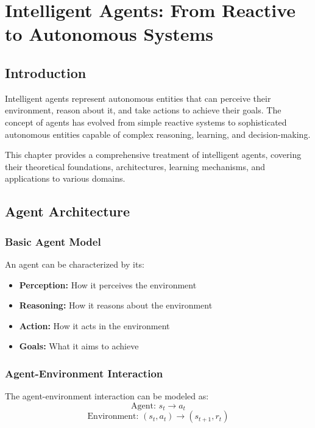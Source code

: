\chapter{Intelligent Agents: From Reactive to Autonomous Systems}

\section{Introduction}

Intelligent agents represent autonomous entities that can perceive their environment, reason about it, and take actions to achieve their goals. The concept of agents has evolved from simple reactive systems to sophisticated autonomous entities capable of complex reasoning, learning, and decision-making.

This chapter provides a comprehensive treatment of intelligent agents, covering their theoretical foundations, architectures, learning mechanisms, and applications to various domains.

\section{Agent Architecture}

\subsection{Basic Agent Model}

An agent can be characterized by its:
\begin{itemize}
    \item \textbf{Perception:} How it perceives the environment
    \item \textbf{Reasoning:} How it reasons about the environment
    \item \textbf{Action:} How it acts in the environment
    \item \textbf{Goals:} What it aims to achieve
\end{itemize}

\subsection{Agent-Environment Interaction}

The agent-environment interaction can be modeled as:
\begin{equation}
    \text{Agent: } s_t \rightarrow a_t
\end{equation}
\begin{equation}
    \text{Environment: } (s_t, a_t) \rightarrow (s_{t+1}, r_t)
\end{equation}

